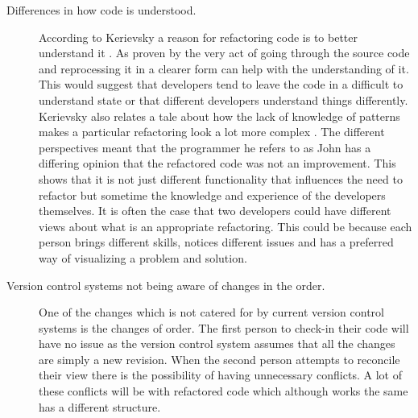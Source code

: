 \begin{description}
\item [Differences in how code is understood.]    
According to  Kerievsky a reason for refactoring code is to better understand it \cite{Kerievsky2004}. As proven by \cite{Bois2005} the very act of going through the source code and reprocessing it in a clearer form can help with the understanding of it. This would suggest that developers tend to leave the code in a difficult to understand state or that different developers understand things differently.
Kerievsky also relates a tale about how the lack of knowledge of patterns makes a particular refactoring look a lot more complex \cite{Kerievsky2004}. The different perspectives meant that the programmer he refers to as John has a differing opinion that the refactored code was not an improvement. This shows that it is not just different functionality that influences the need to refactor but sometime the knowledge and experience of the developers themselves. It is often the case that two developers could have different views about what is an appropriate refactoring. This could be because each person brings different skills, notices different issues and has a preferred way of visualizing a problem and solution.
\item [Version control systems not being aware of changes in the order.]
One of the changes which is not catered for by current version control systems is the changes of order.  The first person to check-in their code will have no issue as the version control system assumes that all the changes are simply a new revision.  When the second person attempts to reconcile their view there is the possibility of having unnecessary conflicts.  A lot of these conflicts will be with refactored code which although works the same has a different structure.
\end{description}







